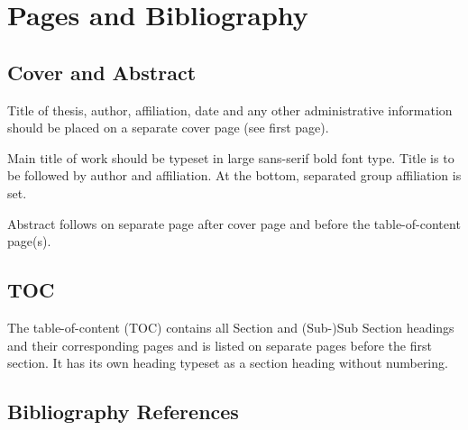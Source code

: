 \documentclass[11pt, a4paper,oneside,chapterprefix=false]{scrbook}
\begin{document}
\chapter{Pages and Bibliography}


\section{Cover and Abstract}

Title of thesis, author, affiliation, date and any other administrative information should be placed on a separate cover page (see first page).

Main title of work should be typeset in large sans-serif bold font type. Title is to be followed by author and affiliation. At the bottom, separated group affiliation is set.

Abstract follows on separate page after cover page and before the table-of-content page(s).


\section{TOC}

The table-of-content (TOC) contains all Section and (Sub-)Sub Section headings and their corresponding pages and is listed on separate pages before the first section. It has its own heading typeset as a section heading without numbering.


\section{Bibliography References}
\end{document}
